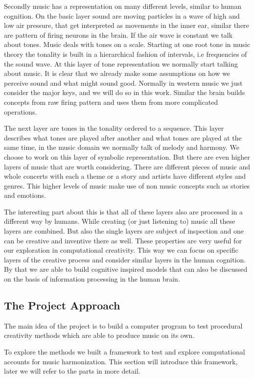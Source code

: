 Secondly music has a representation on many different levels, similar to human cognition. On the basic layer sound are moving particles in a wave of high and low air pressure, that get interpreted as movements in the inner ear, similar there are pattern of firing neurons in the brain. If the air wave is constant we talk about tones. Music deals with tones on a scale. Starting at one root tone in music theory the tonality is built in a hierarchical fashion of intervals, i.e frequencies of the sound wave. At this layer of tone representation we normally start talking about music. It is clear that we already make some assumptions on how we perceive sound and what might sound good. Normally in western music we just consider the major keys, and we will do so in this work. Similar the brain builds concepts from raw firing pattern and uses them from more complicated operations.

The next layer are tones in the tonality ordered to a sequence. This layer describes what tones are played after another and what tones are played at the same time, in the music domain we normally talk of melody and harmony. We choose to work on this layer of symbolic representation. But there are even higher layers of music that are worth considering. There are different pieces of music and whole concerts with each a theme or a story and artists have different styles and genres. This higher levels of music make use of non music concepts such as stories and emotions. 

The interesting part about this is that all of these layers also are processed in a different way by humans. While creating (or just listening to) music all these layers are combined. But also the single layers are subject of inspection and one can be creative and inventive there as well. These properties are very useful for our exploration in computational creativity. This way we can focus on specific layers of the creative process and consider similar layers in the human cognition. By that we are able to build cognitive inspired models that can also be discussed on the basis of information processing in the human brain. 

\subsection{The Project Approach}
The main idea of the project is to build a computer program to test procedural creativity methods which are able to produce music on its own. 

To explore the methods we built a framework to test and explore computational accounts for music harmonization. This section will introduce this framework, later we will refer to the parts in more detail.

